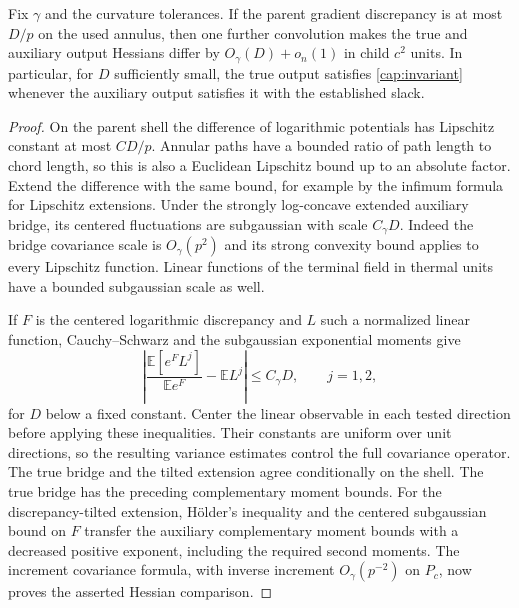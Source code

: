\begin{lemma}\label{cap:remove-auxiliary}
Fix $\gamma$ and the curvature tolerances.  If the parent
gradient discrepancy is at most $D/p$ on the used annulus,
then one further convolution makes the true and auxiliary
output Hessians differ by $O_\gamma(D)+o_n(1)$ in child
$c^2$ units.  In particular, for $D$ sufficiently small,
the true output satisfies \eqref{cap:invariant} whenever
the auxiliary output satisfies it with the established
slack.
\end{lemma}

\begin{proof}
On the parent shell the difference of logarithmic
potentials has Lipschitz constant at most $CD/p$.
Annular paths have a bounded ratio of path length to
chord length, so this is also a Euclidean Lipschitz
bound up to an absolute factor.  Extend the difference
with the same bound, for example by the infimum formula
for Lipschitz extensions.  Under the strongly log-concave
extended auxiliary bridge, its centered fluctuations
are subgaussian with scale $C_\gamma D$.  Indeed the
bridge covariance scale is $O_\gamma(p^2)$ and its
strong convexity bound applies to every Lipschitz
function.  Linear functions of the terminal field in
thermal units have a bounded subgaussian scale as well.

If $F$ is the centered logarithmic discrepancy and
$L$ such a normalized linear function, Cauchy--Schwarz
and the subgaussian exponential moments give
\[
 \left|\frac{\mathbb E[e^F L^j]}{\mathbb E e^F}
                      -\mathbb E L^j\right|
       \le C_\gamma D,\qquad j=1,2,
\]
for $D$ below a fixed constant. Center the linear observable in each tested
direction before applying these inequalities. Their constants are uniform over
unit directions, so the resulting variance estimates control the full
covariance operator. The true bridge and the tilted extension agree
conditionally on the shell. The true bridge has the preceding complementary
moment bounds. For the discrepancy-tilted extension, H\"older's inequality
and the centered subgaussian bound on $F$ transfer the auxiliary complementary
moment bounds with a decreased positive exponent, including the required
second moments. The increment covariance
formula, with inverse increment $O_\gamma(p^{-2})$ on $P_c$, now proves the
asserted Hessian comparison. \end{proof}

